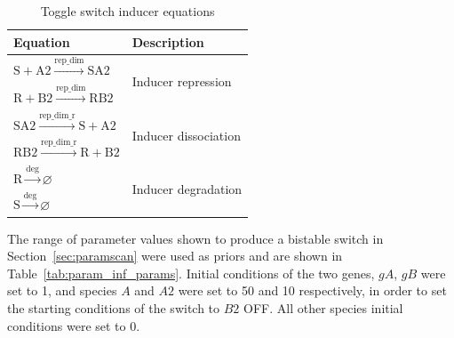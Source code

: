\begin{table}[htbp]
\centering
\caption{Toggle switch inducer equations}
\label{tab:toglle-inducer-equs}
\begin{tabular}{@{}ll@{}}
\toprule
Equation                                                                                & Description                           \\ \midrule
$\textrm{S} + \textrm{A2} \stackrel{\textrm{rep\_dim}}{\longrightarrow}\textrm{SA2}$    & \multirow{2}{*}{Inducer repression}   \\
$\textrm{R} + \textrm{B2} \stackrel{\textrm{rep\_dim}}{\longrightarrow}\textrm{RB2}$    &                                       \\
$\textrm{SA2} \stackrel{\textrm{rep\_dim\_r}}{\longrightarrow}\textrm{S} + \textrm{A2}$ & \multirow{2}{*}{Inducer dissociation} \\
$\textrm{RB2} \stackrel{\textrm{rep\_dim\_r}}{\longrightarrow}\textrm{R} + \textrm{B2}$ &                                       \\
$\textrm{R} \stackrel{\textrm{deg}}{\longrightarrow} \varnothing$                       & \multirow{2}{*}{Inducer degradation}  \\
$\textrm{S} \stackrel{\textrm{deg}}{\longrightarrow}\varnothing$                        &                                       \\ \cmidrule(r){1-2}
\end{tabular}
\end{table}
The range of parameter values shown to produce a bistable switch in Section~\ref{sec:paramscan} were used as priors and are shown in Table~\ref{tab:param_inf_params}. Initial conditions of the two genes, $gA$, $gB$ were set to 1, and species $A$ and $A2$ were set to 50 and 10 respectively, in order to set the starting conditions of the switch to $B2$ OFF. All other species initial conditions were set to 0. 


